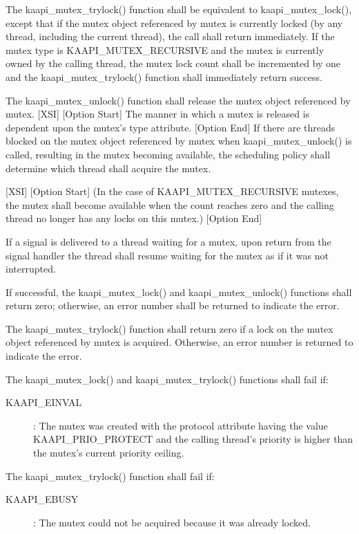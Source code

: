 \begin{description}
The kaapi\_mutex\_trylock() function shall be equivalent to
kaapi\_mutex\_lock(), except that if the mutex object referenced by mutex is
currently locked (by any thread, including the current thread), the call shall
return immediately. If the mutex type is KAAPI\_MUTEX\_RECURSIVE and the mutex
is currently owned by the calling thread, the mutex lock count shall be
incremented by one and the kaapi\_mutex\_trylock() function shall immediately
return success.

The kaapi\_mutex\_unlock() function shall release the mutex object referenced
by mutex. [XSI] [Option Start] The manner in which a mutex is released is
dependent upon the mutex's type attribute. [Option End] If there are threads
blocked on the mutex object referenced by mutex when kaapi\_mutex\_unlock() is
called, resulting in the mutex becoming available, the scheduling policy shall
determine which thread shall acquire the mutex.

[XSI] [Option Start] (In the case of KAAPI\_MUTEX\_RECURSIVE mutexes, the
mutex shall become available when the count reaches zero and the calling
thread no longer has any locks on this mutex.) [Option End]

If a signal is delivered to a thread waiting for a mutex, upon return from the
signal handler the thread shall resume waiting for the mutex as if it was not
interrupted.

If successful, the kaapi\_mutex\_lock() and kaapi\_mutex\_unlock() functions
shall return zero; otherwise, an error number shall be returned to indicate
the error.

The kaapi\_mutex\_trylock() function shall return zero if a lock on the mutex
object referenced by mutex is acquired. Otherwise, an error number is returned
to indicate the error.

The kaapi\_mutex\_lock() and kaapi\_mutex\_trylock() functions shall fail if:

\begin{description}
\item [KAAPI\_EINVAL]: The mutex was created with the protocol attribute
  having the value KAAPI\_PRIO\_PROTECT and the calling thread's priority is
  higher than the mutex's current priority ceiling.
\end{description}

The kaapi\_mutex\_trylock() function shall fail if:

\begin{description}
\item [KAAPI\_EBUSY]: The mutex could not be acquired because it was already
  locked.
\end{description}


\end{description}
